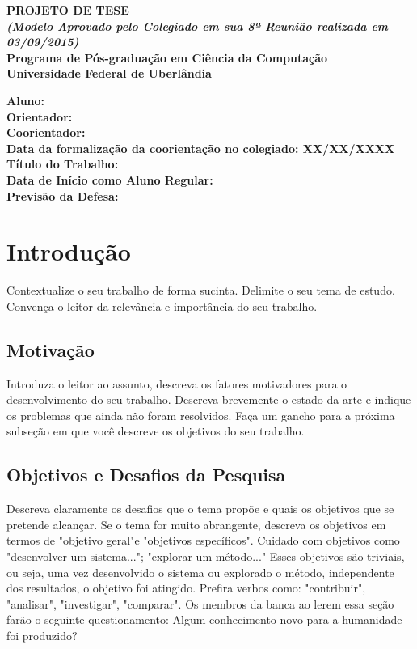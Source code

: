 \documentclass[12pt]{article}
\begin{document}
\begin{center} 
    \bf{{PROJETO DE TESE}\\ $\ $\\
    \textit{(Modelo Aprovado pelo Colegiado em sua 8ª Reunião realizada em 03/09/2015)}\\ $\ $\\}
    {Programa de Pós-graduação em Ciência da Computação\\Universidade Federal de
    Uberlândia}\\
\end{center}

\begin{center}
    \bf{Aluno: \\ $\ $\\
    Orientador: \\ $\ $\\
    Coorientador: \\ $\ $\\
    Data da formalização da coorientação no colegiado: XX/XX/XXXX\\ $\ $\\
    Título do Trabalho: \\ $\ $\\
    Data de Início como Aluno Regular: \\ $\ $\\
    Previsão da Defesa: \\ $\ $\\}
\end{center}

\section{Introdução}
Contextualize o seu trabalho de forma sucinta. Delimite o seu tema de estudo. Convença o leitor da relevância e importância do seu trabalho.

\subsection{Motivação}
Introduza o leitor ao assunto, descreva os fatores motivadores para o desenvolvimento do seu trabalho. Descreva brevemente o estado da arte e indique os problemas que ainda não foram resolvidos. Faça um gancho para a próxima subseção em que você descreve os objetivos do seu trabalho.

\subsection{Objetivos e Desafios da Pesquisa}
Descreva claramente os desafios que o tema propõe e quais os objetivos que se pretende alcançar. Se o tema for muito abrangente, descreva os objetivos em termos de "objetivo geral"e "objetivos específicos". Cuidado com objetivos como "desenvolver um sistema..."; "explorar um método..." Esses objetivos são triviais, ou seja, uma vez desenvolvido o sistema ou explorado o método, independente dos resultados, o objetivo foi atingido. Prefira verbos como: "contribuir", "analisar", "investigar", "comparar". Os membros da banca ao lerem essa seção farão o seguinte questionamento: Algum conhecimento novo para a humanidade foi produzido?
\end{document}

